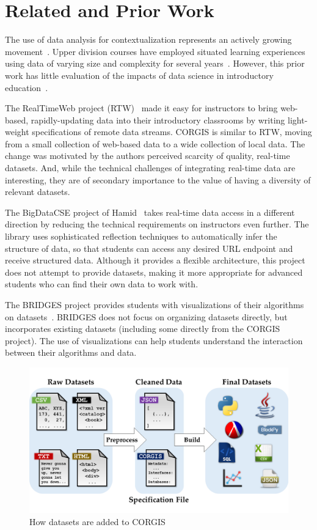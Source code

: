 \documentclass{sig-alternate}
\begin{document}
\section{Related and Prior Work}

The use of data analysis for contextualization represents an actively growing movement~\cite{Anderson, Sullivan:2013,Hall-Holt:2015,DePasquale:2006}.
Upper division courses have employed situated learning experiences using data of varying size and complexity for several years~\cite{Egger,datamining}.
However, this prior work has little evaluation of the impacts of data science in introductory education~\cite{Sullivan:2013,DePasquale:2006}.

The RealTimeWeb project (RTW)~\cite{realtimeweb} made it easy for instructors to bring web-based, rapidly-updating data into their introductory classrooms by writing light-weight specifications of remote data streams.
CORGIS is similar to RTW, moving from a small collection of web-based data to a wide collection of local data.
The change was motivated by the authors perceived scarcity of quality, real-time datasets.
And, while the technical challenges of integrating real-time data are interesting, they are of secondary importance to the value of having a diversity of relevant datasets.

The BigDataCSE project of Hamid~\cite{Hamid2016} takes real-time data access in a different direction by reducing the technical requirements on instructors even further.
The library uses sophisticated reflection techniques to automatically infer the structure of data, so that students can access any desired URL endpoint and receive structured data.
Although it provides a flexible architecture, this project does not attempt to provide datasets, making it more appropriate for advanced students who can find their own data to work with.

The BRIDGES project provides students with visualizations of their algorithms on datasets~\cite{burlinson2016bridges}.
BRIDGES does not focus on organizing datasets directly, but incorporates existing datasets (including some directly from the CORGIS project).
The use of visualizations can help students understand the interaction between their algorithms and data.

\begin{figure}[!ht]
    \centering
    \includegraphics[width=.47\textwidth]{graphics/process}
    \vspace{-\bigskipamount}
    \vspace{-\smallskipamount}
    \caption{How datasets are added to CORGIS}
    \label{fig:corgis-build}
\end{figure}
\end{document}

